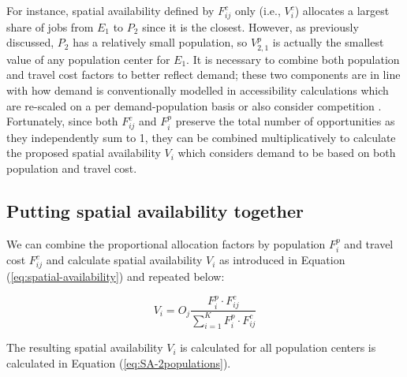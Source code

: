 \documentclass[]{elsarticle} %
\begin{document}
For instance, spatial availability defined by \(F^c_{ij}\) only (i.e.,
\(V^c_{i}\)) allocates a largest share of jobs from \(E_1\) to \(P_2\)
since it is the closest. However, as previously discussed, \(P_2\) has a
relatively small population, so \(V^p_{2,1}\) is actually the smallest
value of any population center for \(E_1\). It is necessary to combine
both population and travel cost factors to better reflect demand; these
two components are in line with how demand is conventionally modelled in
accessibility calculations which are re-scaled on a per
demand-population basis or also consider competition
\citep[e.g.,][]{allen2019, barboza_balancing_2021, yang_comparing_2006}.
Fortunately, since both \(F^c_{ij}\) and \(F^p_{i}\) preserve the total
number of opportunities as they independently sum to 1, they can be
combined multiplicatively to calculate the proposed spatial availability
\(V_{i}\) which considers demand to be based on both population and
travel cost.

\hypertarget{putting-spatial-availability-together}{%
\subsection{Putting spatial availability
together}\label{putting-spatial-availability-together}}

We can combine the proportional allocation factors by population
\(F^p_{i}\) and travel cost \(F^c_{ij}\) and calculate spatial
availability \(V_{i}\) as introduced in Equation
(\ref{eq:spatial-availability}) and repeated below:

\[
V_{i} = O_j\frac{F^p_{i} \cdot F^c_{ij}}{\sum_{i=1}^K F^p_{i} \cdot F^c_{ij}}
\]

The resulting spatial availability \(V_{i}\) is calculated for all
population centers is calculated in Equation (\ref{eq:SA-2populations}).
\end{document}
